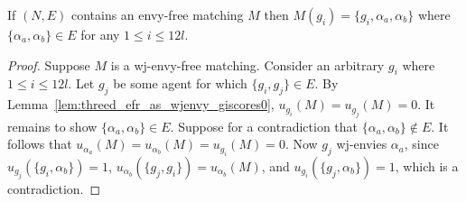 \begin{lem}
\label{lem:threed_efr_as_wjenvy_gi011}
If $(N, E)$ contains an envy-free matching $M$ then $M(g_i) = \{ g_i, \alpha_a, \alpha_b \}$ where $\{ \alpha_a, \alpha_b \} \in E$ for any $1\leq i\leq 12l$.
\end{lem}
\begin{proof}
Suppose $M$ is a wj-envy-free matching. Consider an arbitrary $g_i$ where $1\leq i \leq 12l$. Let $g_j$ be some agent for which $\{ g_i, g_j \} \in E$. By Lemma~\ref{lem:threed_efr_as_wjenvy_giscores0}, $u_{g_i}(M)=u_{g_j}(M)=0$. It remains to show $\{ \alpha_a, \alpha_b \} \in E$. Suppose for a contradiction that $\{ \alpha_a, \alpha_b \} \notin E$. It follows that $u_{\alpha_a}(M)=u_{\alpha_b}(M)=u_{g_i}(M)=0$. Now $g_j$ wj-envies $\alpha_a$, since $u_{g_j}(\{ g_i, \alpha_b \})=1$, $u_{\alpha_b}(\{ g_j, g_i \})=u_{\alpha_b}(M)$, and $u_{g_i}(\{ g_j, \alpha_b \})=1$, which is a contradiction.
\end{proof}

